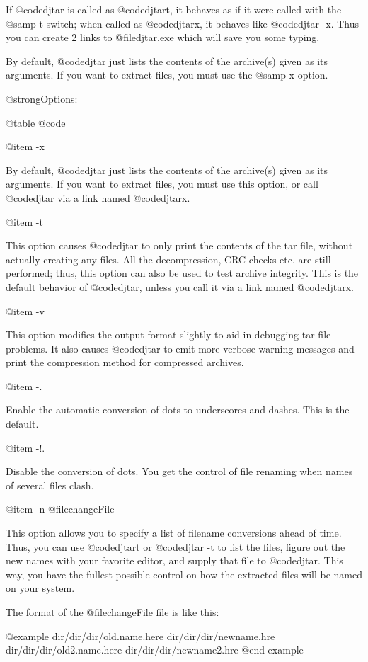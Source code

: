 If @code{djtar} is called as @code{djtart}, it behaves as if it were
called with the @samp{-t} switch; when called as @code{djtarx}, it
behaves like @code{djtar -x}.  Thus you can create 2 links to
@file{djtar.exe} which will save you some typing.

By default, @code{djtar} just lists the contents of the archive(s)
given as its arguments.  If you want to extract files, you must use
the @samp{-x} option.

@strong{Options:}

@table @code

@item -x

By default, @code{djtar} just lists the contents of the archive(s)
given as its arguments.  If you want to extract files, you must use
this option, or call @code{djtar} via a link named @code{djtarx}.

@item -t

This option causes @code{djtar} to only print the contents of the tar
file, without actually creating any files.  All the decompression, CRC
checks etc. are still performed; thus, this option can also be used to
test archive integrity.  This is the default behavior of
@code{djtar}, unless you call it via a link named @code{djtarx}.

@item -v

This option modifies the output format slightly to aid in debugging tar
file problems.  It also causes @code{djtar} to emit more verbose warning
messages and print the compression method for compressed archives.

@item -.

Enable the automatic conversion of dots to underscores and dashes.  This
is the default.

@item -!.

Disable the conversion of dots.  You get the control of file renaming when
names of several files clash.

@item -n @file{changeFile}

This option allows you to specify a list of filename conversions ahead of
time.  Thus, you can use @code{djtart} or @code{djtar -t} to list the
files, figure out the new names with your favorite editor, and supply that
file to @code{djtar}.  This way, you have the fullest possible control on
how the extracted files will be named on your system.

The format of the @file{changeFile} file is like this:

@example
dir/dir/dir/old.name.here  dir/dir/dir/newname.hre
dir/dir/dir/old2.name.here  dir/dir/dir/newname2.hre
@end example

